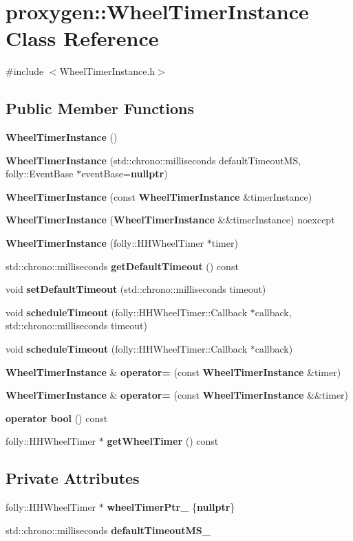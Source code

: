 \section{proxygen\+:\+:Wheel\+Timer\+Instance Class Reference}
\label{classproxygen_1_1WheelTimerInstance}


{\ttfamily \#include $<$Wheel\+Timer\+Instance.\+h$>$}

\subsection*{Public Member Functions}
\begin{DoxyCompactItemize}
\item 
{\bf Wheel\+Timer\+Instance} ()
\item 
{\bf Wheel\+Timer\+Instance} (std\+::chrono\+::milliseconds default\+Timeout\+MS, folly\+::\+Event\+Base $\ast$event\+Base={\bf nullptr})
\item 
{\bf Wheel\+Timer\+Instance} (const {\bf Wheel\+Timer\+Instance} \&timer\+Instance)
\item 
{\bf Wheel\+Timer\+Instance} ({\bf Wheel\+Timer\+Instance} \&\&timer\+Instance) noexcept
\item 
{\bf Wheel\+Timer\+Instance} (folly\+::\+H\+H\+Wheel\+Timer $\ast$timer)
\item 
std\+::chrono\+::milliseconds {\bf get\+Default\+Timeout} () const 
\item 
void {\bf set\+Default\+Timeout} (std\+::chrono\+::milliseconds timeout)
\item 
void {\bf schedule\+Timeout} (folly\+::\+H\+H\+Wheel\+Timer\+::\+Callback $\ast$callback, std\+::chrono\+::milliseconds timeout)
\item 
void {\bf schedule\+Timeout} (folly\+::\+H\+H\+Wheel\+Timer\+::\+Callback $\ast$callback)
\item 
{\bf Wheel\+Timer\+Instance} \& {\bf operator=} (const {\bf Wheel\+Timer\+Instance} \&timer)
\item 
{\bf Wheel\+Timer\+Instance} \& {\bf operator=} (const {\bf Wheel\+Timer\+Instance} \&\&timer)
\item 
{\bf operator bool} () const 
\item 
folly\+::\+H\+H\+Wheel\+Timer $\ast$ {\bf get\+Wheel\+Timer} () const 
\end{DoxyCompactItemize}
\subsection*{Private Attributes}
\begin{DoxyCompactItemize}
\item 
folly\+::\+H\+H\+Wheel\+Timer $\ast$ {\bf wheel\+Timer\+Ptr\+\_\+} \{{\bf nullptr}\}
\item 
std\+::chrono\+::milliseconds {\bf default\+Timeout\+M\+S\+\_\+}
\end{DoxyCompactItemize}


